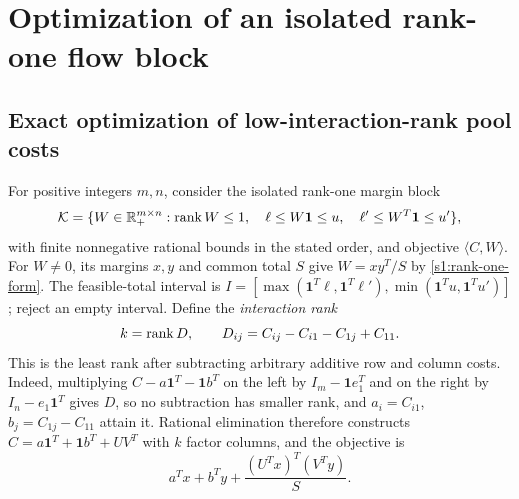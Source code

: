 \section{Optimization of an isolated rank-one flow block}\label{app:costs}

\subsection{Exact optimization of low-interaction-rank pool costs}
\label{s6:low-rank}
For positive integers $m,n$, consider the isolated rank-one margin block
\begin{equation}
 \mathcal K=\{W\in\mathbb R_+^{m\times n}:\operatorname{rank} W\le1,\quad
 \ell\le W\mathbf1\le u,\quad
 \ell'\le W^T\mathbf1\le u'\},\label{s6:margin-block}
\end{equation}
with finite nonnegative rational bounds in the stated order, and objective
$\langle C,W\rangle$. For $W\ne0$, its margins $x,y$ and common total
$S$ give $W=xy^T/S$ by \eqref{s1:rank-one-form}.
The feasible-total interval is
$I=[\max(\mathbf1^T\ell,\mathbf1^T\ell'),
\min(\mathbf1^Tu,\mathbf1^Tu')]$; reject an empty interval.
Define the \emph{interaction rank}
\[
 k=\operatorname{rank} D,\qquad D_{ij}=C_{ij}-C_{i1}-C_{1j}+C_{11}.
\]
This is the least rank after subtracting arbitrary additive row and
column costs. Indeed, multiplying $C-a\mathbf1^T-\mathbf1b^T$ on the
left by $I_m-\mathbf1e_1^T$ and on the right by $I_n-e_1\mathbf1^T$
gives $D$, so no subtraction has smaller rank, and
$a_i=C_{i1}$, $b_j=C_{1j}-C_{11}$ attain it.
Rational elimination therefore constructs
$C=a\mathbf1^T+\mathbf1b^T+UV^T$ with $k$ factor columns,
and the objective is
\begin{equation}
 a^Tx+b^Ty+\frac{(U^Tx)^T(V^Ty)}S.\label{s6:interaction-objective}
\end{equation}

